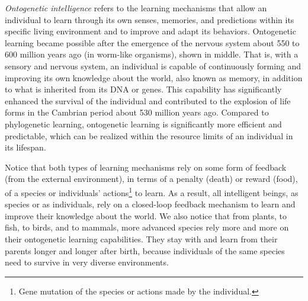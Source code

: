 \documentclass[../../book-main.tex]{subfiles}
\begin{document}
{\em Ontogenetic intelligence} refers to the learning mechanisms that allow an individual to learn through its own senses, memories, and predictions within its specific living environment and to improve and adapt its behaviors. Ontogenetic learning became possible after the emergence of the nervous system about 550 to 600 million years ago (in worm-like organisms), shown in  middle. That is, with a sensory and nervous system, an individual is capable of continuously forming and improving its own knowledge about the world, also known as memory, in addition to what is inherited from its DNA or genes. This capability has significantly enhanced the survival of the individual and contributed to the explosion of life forms in the Cambrian period about 530 million years ago. Compared to phylogenetic learning, ontogenetic learning is significantly more efficient and predictable, which can be realized within the resource limits of an individual in its lifespan.

Notice that both types of learning mechanisms rely on some form of feedback (from the external environment), in terms of a penalty (death) or reward (food), of a species or individuals' actions\footnote{Gene mutation of the species or actions made by the individual.} to learn. As a result, all intelligent beings, as species or as individuals, rely on a closed-loop feedback mechanism to learn and improve their knowledge about the world. We also notice that from plants, to fish, to birds, and to mammals, more advanced species rely more and more on their ontogenetic learning capabilities. They stay with and learn from their parents longer and longer after birth, because individuals of the same species need to survive in very diverse environments. 
\end{document}
